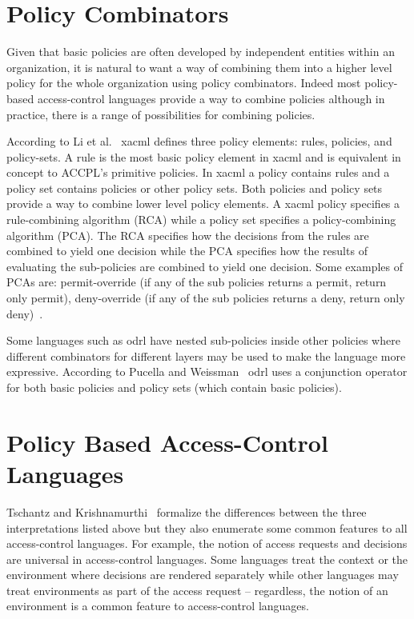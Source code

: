 \section{Policy Combinators}\label{sec:policycombinators}

Given that basic policies are often developed by independent entities within an organization, it is natural to want a way of combining them into a higher level policy for the whole organization using policy combinators. Indeed most policy-based access-control languages provide a way to combine policies although in practice, there is a range of possibilities for combining policies. 

According to Li et al.~\cite{LiWQBRLL09} \ac{xacml} defines three policy elements: rules, policies, and policy-sets. A rule is the most basic policy element in \ac{xacml} and is equivalent in concept to \ac{ACCPL}'s primitive policies. In \ac{xacml} a policy contains rules and a policy set contains policies or other policy sets. Both policies and policy sets provide a way to combine lower level policy elements. A \ac{xacml} policy specifies a rule-combining algorithm (RCA) while a policy set specifies a policy-combining algorithm (PCA). The RCA specifies
how the decisions from the rules are combined to yield one decision while the PCA specifies how the results of evaluating the sub-policies are combined to
yield one decision. Some examples of PCAs are: permit-override (if any of the sub policies returns a permit, return only permit), deny-override (if any of the sub policies returns a deny, return only deny)~\cite{Tschantz}. 

Some languages such as \ac{odrl} have nested sub-policies inside other policies where different combinators for different layers may be used to make the language more expressive. According to Pucella and Weissman~\cite{pucella2006} \ac{odrl} uses a conjunction operator for both basic policies and policy sets (which contain basic policies).







\section{Policy Based Access-Control Languages}

Tschantz and Krishnamurthi~\cite{Tschantz} formalize the differences between the three interpretations listed above but they also enumerate some common features to all access-control languages. For example, the notion of access requests and decisions are universal in access-control languages. Some languages treat the context or the environment where decisions are rendered separately while other languages may treat environments as part of the access request -- regardless, the notion of an environment is a common feature to access-control languages.


